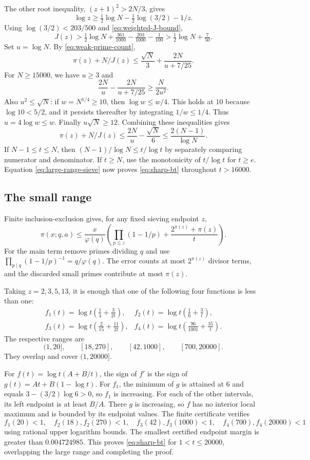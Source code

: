 The other root inequality, $(z+1)^2>2N/3$, gives
\[
 \log z\geq\tfrac12\log N-\tfrac12\log(3/2)-1/z.
\]
Using $\log(3/2)<203/500$ and \eqref{eq:weighted-J-bound},
\[
 J(z)>\tfrac12\log N+\tfrac{361}{1000}
                        -\tfrac{203}{1000}-\tfrac1{100}
       >\tfrac12\log N+\tfrac7{50}.
\]
Set $u=\log N$.  By \eqref{eq:weak-prime-count},
\[
 \pi(z)+N/J(z)\leq\frac{\sqrt N}{3}
                       +\frac{2N}{u+7/25}.
\]
For $N\geq15000$, we have $u\geq3$ and
\[
 \frac{2N}{u}-\frac{2N}{u+7/25}\geq\frac N{2u^2}.
\]
Also $u^2\leq\sqrt N$: if $w=N^{1/4}\geq10$, then
$\log w\leq w/4$.  This holds at $10$ because
$\log10<5/2$, and it persists thereafter by integrating
$1/w\leq1/4$.  Thus $u=4\log w\leq w$.
Finally $u\sqrt N\geq12$.  Combining these inequalities gives
\[
 \pi(z)+N/J(z)
 \leq\frac{2N}{u}-\frac{\sqrt N}{6}
 \leq\frac{2(N-1)}{\log N}.
\]
If $N-1\leq t\leq N$, then
$(N-1)/\log N\leq t/\log t$ by separately comparing numerator
and denominator.  If $t\geq N$, use the monotonicity of
$t/\log t$ for $t\geq e$.  Equation
\eqref{eq:large-range-sieve} now proves \eqref{eq:sharp-bt}
throughout $t>16000$.

\subsection{The small range}

Finite inclusion-exclusion gives, for any fixed sieving endpoint $z$,
\[
 \pi(x;q,a)\leq\frac{x}{\varphi(q)}
 \left(\prod_{p\leq z}(1-1/p)
       +\frac{2^{\pi(z)}+\pi(z)}{t}\right).
\]
For the main term remove primes dividing $q$ and use
$\prod_{p\mid q}(1-1/p)^{-1}=q/\varphi(q)$.
The error counts at most $2^{\pi(z)}$ divisor terms, and the
discarded small primes contribute at most $\pi(z)$.

Taking $z=2,3,5,13$, it is enough that one of the following four
functions is less than one:
\[
\begin{array}{ll}
 f_1(t)=\log t\left(\frac14+\frac3{2t}\right),&
 f_2(t)=\log t\left(\frac16+\frac3t\right),\\[3pt]
 f_3(t)=\log t\left(\frac2{15}+\frac{11}{2t}\right),&
 f_4(t)=\log t\left(\frac{96}{1001}+\frac{35}t\right).
\end{array}
\]
The respective ranges are
\[
 (1,20],\qquad[18,270],\qquad[42,1000],\qquad[700,20000].
\]
They overlap and cover $(1,20000]$.

For $f(t)=\log t(A+B/t)$, the sign of $f'$ is the sign of
$g(t)=At+B(1-\log t)$.
For $f_1$, the minimum of $g$ is attained at $6$ and equals
$3-(3/2)\log6>0$, so $f_1$ is increasing.
For each of the other intervals, its left endpoint is at least
$B/A$.  There $g$ is increasing, so $f$ has no interior local
maximum and is bounded by its endpoint values.
The finite certificate verifies
\[
 f_1(20)<1,\quad f_2(18),f_2(270)<1,\quad
 f_3(42),f_3(1000)<1,\quad f_4(700),f_4(20000)<1
\]
using rational upper logarithm bounds.  The smallest certified
endpoint margin is greater than $0.004724985$.
This proves \eqref{eq:sharp-bt} for $1<t\leq20000$, overlapping
the large range and completing the proof.

